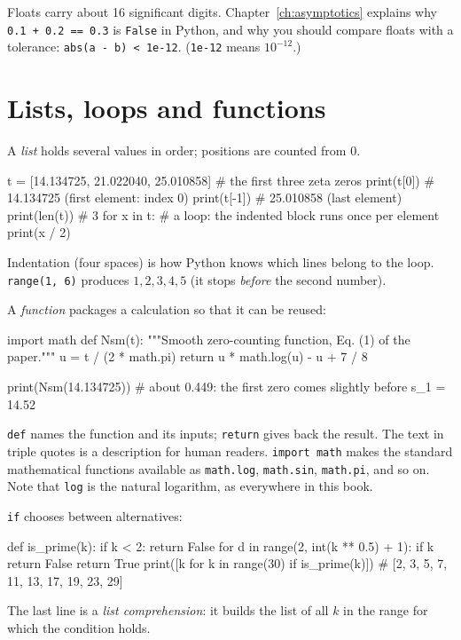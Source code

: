 Floats carry about 16 significant digits. Chapter~\ref{ch:asymptotics} explains why \texttt{0.1 + 0.2 == 0.3} is \texttt{False} in Python, and why you should compare floats with a tolerance: \texttt{abs(a - b) < 1e-12}. (\texttt{1e-12} means $10^{-12}$.)

\section{Lists, loops and functions}

A \emph{list} holds several values in order; positions are counted from $0$.
\begin{pycode}
t = [14.134725, 21.022040, 25.010858]   # the first three zeta zeros
print(t[0])        # 14.134725 (first element: index 0)
print(t[-1])       # 25.010858 (last element)
print(len(t))      # 3
for x in t:        # a loop: the indented block runs once per element
    print(x / 2)
\end{pycode}
Indentation (four spaces) is how Python knows which lines belong to the loop. \texttt{range(1, 6)} produces $1,2,3,4,5$ (it stops \emph{before} the second number).

A \emph{function} packages a calculation so that it can be reused:
\begin{pycode}
import math
def Nsm(t):
    """Smooth zero-counting function, Eq. (1) of the paper."""
    u = t / (2 * math.pi)
    return u * math.log(u) - u + 7 / 8

print(Nsm(14.134725))   # about 0.449: the first zero comes slightly before s_1 = 14.52
\end{pycode}
\texttt{def} names the function and its inputs; \texttt{return} gives back the result. The text in triple quotes is a description for human readers. \texttt{import math} makes the standard mathematical functions available as \texttt{math.log}, \texttt{math.sin}, \texttt{math.pi}, and so on. Note that \texttt{log} is the natural logarithm, as everywhere in this book.

\texttt{if} chooses between alternatives:
\begin{pycode}
def is_prime(k):
    if k < 2:
        return False
    for d in range(2, int(k ** 0.5) + 1):
        if k %
            return False
    return True
print([k for k in range(30) if is_prime(k)])   # [2, 3, 5, 7, 11, 13, 17, 19, 23, 29]
\end{pycode}
The last line is a \emph{list comprehension}: it builds the list of all $k$ in the range for which the condition holds.

